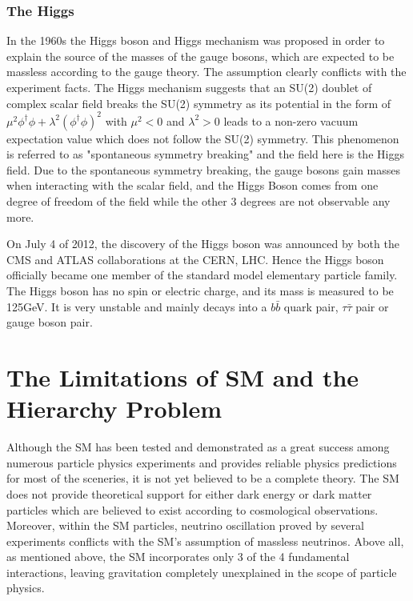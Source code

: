 \subsubsection{The Higgs}
In the 1960s the Higgs boson and Higgs mechanism was proposed in order to explain the source of the masses of the gauge bosons\cite{higgstheory1,higgstheory2,higgstheory3}, which are expected to be massless according to the gauge theory. The assumption clearly conflicts with the experiment facts. The Higgs mechanism suggests that an SU(2) doublet of complex scalar field breaks the SU(2) symmetry as its potential in the form of $\mu^{2}\phi^{\dagger}\phi + \lambda^{2}(\phi^{\dagger}\phi)^2$ with $\mu^{2}<0$ and $\lambda^{2}>0$ leads to a non-zero vacuum expectation value which does not follow the SU(2) symmetry. This phenomenon is referred to as "spontaneous symmetry breaking" and the field here is the Higgs field. Due to the spontaneous symmetry breaking, the gauge bosons gain masses when interacting with the scalar field, and the Higgs Boson comes from one degree of freedom of the field while the other 3 degrees are not observable any more.

\vspace{0.3cm}
On July 4 of 2012, the discovery of the Higgs boson was announced by both the CMS and ATLAS collaborations at the CERN, LHC\cite{higgsdiscover1,higgsdiscover2}. Hence the Higgs boson officially became one member of the standard model elementary particle family. The Higgs boson has no spin or electric charge, and its mass is measured to be 125GeV. It is very unstable and mainly decays into a $b\bar{b}$ quark pair, $\tau\bar{\tau}$ pair or gauge boson pair.

\section{The Limitations of SM and the Hierarchy Problem}
Although the SM has been tested and demonstrated as a great success among numerous particle physics experiments and provides reliable physics predictions for most of the sceneries, it is not yet believed to be a complete theory. The SM does not provide theoretical support for either dark energy or dark matter particles which are believed to exist according to cosmological observations. Moreover, within the SM particles, neutrino oscillation proved by several experiments conflicts with the SM's assumption of massless neutrinos. Above all, as mentioned above, the SM incorporates only 3 of the 4 fundamental interactions, leaving gravitation completely unexplained in the scope of particle physics.

